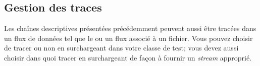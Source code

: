 \documentclass[a4paper,10pt,twoside]{book}
\begin{document}
\subsection{Gestion des traces}
Les chaînes descriptives présentées précédemment peuvent aussi être tracées dans un flux 
de données  tel que le  ou un flux associé à un fichier. 
Vous pouvez choisir de tracer ou non en surchargeant  dans votre 
classe de test; vous devez aussi choisir dans quoi tracer en surchargeant  
de façon à fournir un \emph{stream} approprié.

\end{document}
